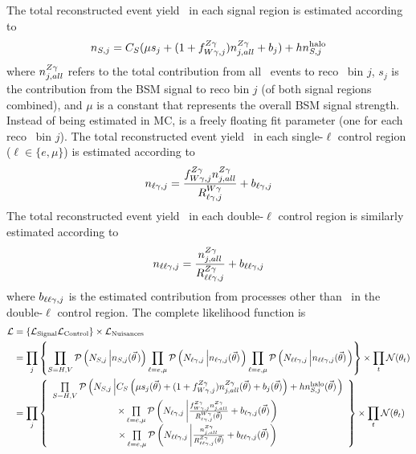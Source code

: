 The total reconstructed event yield \nS\ in each signal region is estimated according to
\begin{equation}
  \nS[,j] = C_{S} (\mu s_{j} + (1 + \fZW[,j])\nZg[j,all] + b_{j}) + h\nhalo[,j]
\end{equation}
where $\nZg[j,all]$ refers to the total contribution from all \zinvg\ events to reco \ETgamma\ bin $j$, $s_{j}$ is the contribution from the BSM
signal to reco bin $j$ (of both signal regions combined), and $\mu$ is a constant that represents the overall BSM signal strength.
Instead of being estimated in MC, \nZg[j,all] is a freely floating fit parameter (one for each reco \ETgamma\ bin $j$).
The total reconstructed event yield \nl\ in each single-$\ell$ control region ($\ell \in \{e,\mu\}$) is estimated according to
\begin{equation}
  \nl[,j] = \frac{\fZW[,j]\nZg[j,all]}{\RWl[,j]} + b_{\ell\Pgamma,j}
\end{equation}
The total reconstructed event yield \nll\ in each double-$\ell$ control region is similarly estimated according to
\begin{equation}
  \nll[,j] = \frac{\nZg[j,all]}{\RZll[,j]} + b_{\ell\ell\Pgamma,j}
\end{equation}
where $b_{\ell\ell\Pgamma,j}$ is the estimated contribution from processes other than \zllg\ in the double-$\ell$ control region.
The complete likelihood function is
\begin{align}
\begin{split}
  \mathcal{L} & = \left\{ \mathcal{L_{\text{Signal}}} \mathcal{L_{\text{Control}}} \right\} \times \mathcal{L_{\text{Nuisances}}} \\
  & = \prod_{j} \left\{
    \prod_{S=H,V} \mathcal{P}\left( N_{S, j} \left| \nS[,j] (\vec{\theta} \right.) \right)
     \prod_{\ell=\Pe,\Pmu} \mathcal{P}\left( N_{\ell\Pgamma, j} \left| \nl[,j] (\vec{\theta}) \right. \right)
      \prod_{\ell=\Pe,\Pmu} \mathcal{P}\left( N_{\ell\ell\Pgamma, j} \left| \nll[,j] (\vec{\theta}) \right. \right) 
    \right\}  \times \prod_{t} \mathcal{N}(\theta_t) \\
  & = \prod_{j} \left\{
  \begin{array}{cc}
    \prod\limits_{S=H,V} \mathcal{P}\left( N_{S, j} \left| C_{S} \left(\mu s_{j}(\vec{\theta}) + (1 + \fZW[,j])\nZg[j,all](\vec{\theta}) + b_{j}(\vec{\theta})\right) + h \nhalo[,j](\vec{\theta}) \right. \right) \\[1.3pt]
    \times \prod\limits_{\ell=\Pe,\Pmu} \mathcal{P}\left( N_{\ell\Pgamma, j} \left| \frac{\fZW[,j]\nZg[j,all]}{\RWl[,j](\vec{\theta})} + b_{\ell\Pgamma, j}(\vec{\theta}) \right. \right) \\[1.3pt]
    \times \prod\limits_{\ell=\Pe,\Pmu} \mathcal{P}\left( N_{\ell\ell\Pgamma, j} \left| \frac{\nZg[j,all]}{\RZll[,j](\vec{\theta})} + b_{\ell\ell\Pgamma, j}(\vec{\theta}) \right. \right) \\[1.3pt]
  \end{array} \right\}
  \times \prod_{t} \mathcal{N}(\theta_t)
\end{split}
\end{align}

